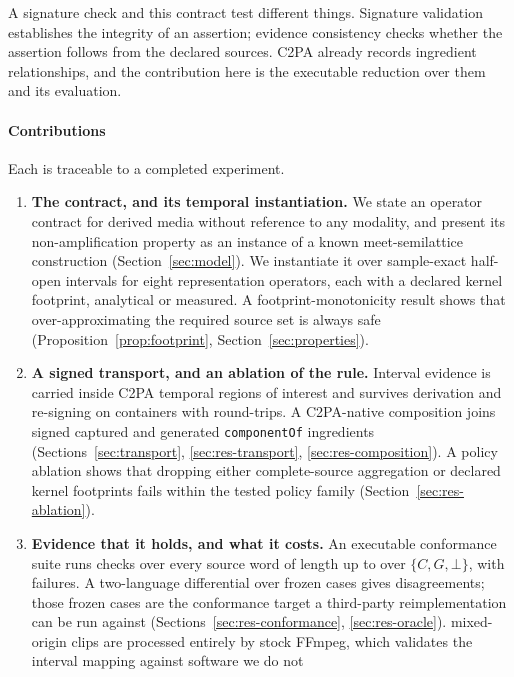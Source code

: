 \documentclass[preprint,3p,11pt,authoryear]{elsarticle}
\newcommand{\C}{\ensuremath{C}}
\newcommand{\G}{\ensuremath{G}}
\begin{document}
A signature check and this contract test different things. Signature
validation establishes the integrity of an assertion; evidence consistency
checks whether the assertion follows from the declared sources. C2PA already
records ingredient relationships, and the contribution here is the executable
reduction over them and its evaluation.

\paragraph{Contributions} Each is traceable to a completed experiment.

\begin{enumerate}
\item \textbf{The contract, and its temporal instantiation.} We state an
  operator contract for derived media without reference to any modality, and
  present its non-amplification property as an instance of a known
  meet-semilattice construction (Section~\ref{sec:model}). We instantiate it
  over sample-exact half-open intervals for eight representation operators,
  each with a declared kernel footprint, analytical or measured. A footprint-monotonicity
  result shows that over-approximating the required source set is always safe
  (Proposition~\ref{prop:footprint}, Section~\ref{sec:properties}).
\item \textbf{A signed transport, and an ablation of the rule.}
  Interval evidence is carried inside C2PA temporal regions of interest and
  survives derivation and re-signing on \Fcontainers{} containers with \Ftotal{}
  round-trips. A C2PA-native composition joins signed captured and generated
  \texttt{componentOf} ingredients (Sections~\ref{sec:transport},
  \ref{sec:res-transport}, \ref{sec:res-composition}). A policy ablation
  shows that dropping either complete-source aggregation or declared kernel
  footprints fails within the tested policy family
  (Section~\ref{sec:res-ablation}).
\item \textbf{Evidence that it holds, and what it costs.} An executable
  conformance suite runs \Achecks{} checks over every source word of length up to
  \Amaxlen{} over $\{\C,\G,\bot\}$, with \Afailed{} failures. A two-language
  differential over \Hcases{} frozen cases gives \Hdis{} disagreements; those
  frozen cases are the conformance target a third-party reimplementation can
  be run against (Sections~\ref{sec:res-conformance},
  \ref{sec:res-oracle}). \Cclips{} mixed-origin clips are processed entirely by
  stock FFmpeg, which validates the interval mapping against software we do not

\end{enumerate}
\end{document}
